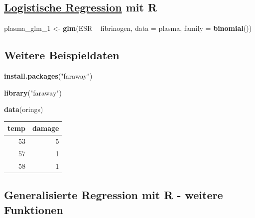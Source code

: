 \documentclass[]{article}
\newenvironment{Shaded}{\begin{snugshade}}{\end{snugshade}}
\newcommand{\KeywordTok}[1]{\textcolor[rgb]{0.13,0.29,0.53}{\textbf{{#1}}}}
\newcommand{\DataTypeTok}[1]{\textcolor[rgb]{0.13,0.29,0.53}{{#1}}}
\newcommand{\StringTok}[1]{\textcolor[rgb]{0.31,0.60,0.02}{{#1}}}
\newcommand{\NormalTok}[1]{{#1}}
\begin{document}
\subsection{\texorpdfstring{\href{http://ww2.coastal.edu/kingw/statistics/R-tutorials/logistic.html}{Logistische
Regression} mit
R}{Logistische Regression mit R}}\label{logistische-regression-mit-r-1}

\begin{Shaded}
\begin{Highlighting}[]
\NormalTok{plasma_glm_1 <-}\StringTok{ }\KeywordTok{glm}\NormalTok{(ESR ~}\StringTok{ }\NormalTok{fibrinogen, }\DataTypeTok{data =} \NormalTok{plasma, }
                    \DataTypeTok{family =} \KeywordTok{binomial}\NormalTok{())}
\end{Highlighting}
\end{Shaded}

\subsection{Weitere Beispieldaten}\label{weitere-beispieldaten}

\begin{Shaded}
\begin{Highlighting}[]
\KeywordTok{install.packages}\NormalTok{(}\StringTok{"faraway"}\NormalTok{)}
\end{Highlighting}
\end{Shaded}

\begin{Shaded}
\begin{Highlighting}[]
\KeywordTok{library}\NormalTok{(}\StringTok{"faraway"}\NormalTok{)}
\end{Highlighting}
\end{Shaded}

\begin{Shaded}
\begin{Highlighting}[]
\KeywordTok{data}\NormalTok{(orings)}
\end{Highlighting}
\end{Shaded}

\begin{longtable}[]{@{}rr@{}}
\toprule
temp & damage\tabularnewline
\midrule
\endhead
53 & 5\tabularnewline
57 & 1\tabularnewline
58 & 1\tabularnewline
\bottomrule
\end{longtable}

\subsection{Generalisierte Regression mit R - weitere
Funktionen}\label{generalisierte-regression-mit-r---weitere-funktionen}
\end{document}
